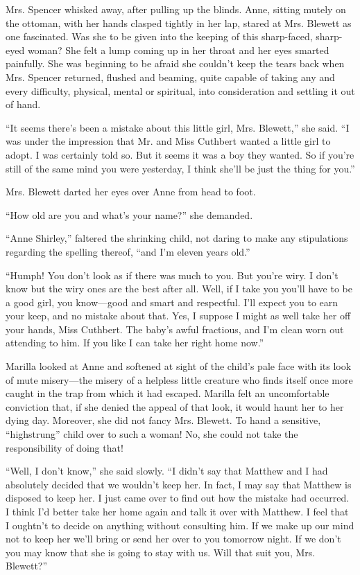 \documentclass[a4paper]{article}
\begin{document}
{{{Mrs. Spencer whisked away, after pulling up the blinds. Anne, sitting mutely on the ottoman, with her hands clasped tightly in her lap, stared at Mrs. Blewett as one fascinated. Was she to be given into the keeping of this sharp-faced, sharp-eyed woman? She felt a lump coming up in her throat and her eyes smarted painfully. She was beginning to be afraid she couldn't keep the tears back when Mrs. Spencer returned, flushed and beaming, quite capable of taking any and every difficulty, physical, mental or spiritual, into consideration and settling it out of hand.}

``It seems there's been a mistake about this little girl, Mrs. Blewett,'' she said. ``I was under the impression that Mr. and Miss Cuthbert wanted a little girl to adopt. I was certainly told so. But it seems it was a boy they wanted. So if you're still of the same mind you were yesterday, I think she'll be just the thing for you.''}

Mrs. Blewett darted her eyes over Anne from head to foot.}

``How old are you and what's your name?'' she demanded.

``Anne Shirley,'' \tiny{faltered the shrinking child, not daring to make any stipulations regarding the spelling thereof}, ``and I'm eleven years old.''

``Humph! You don't look as if there was much to you. But you're wiry. I don't know but the wiry ones are the best after all. \scriptsize{Well, if I take you you'll have to be a good girl, you know---good and smart and respectful. I'll expect you to earn your keep, and no mistake about that.} Yes, I suppose I might as well take her off your hands, Miss Cuthbert. The baby's awful fractious, and I'm clean worn out attending to him. If you like I can take her right home now.''

Marilla looked at Anne and softened at sight of the child's pale face with its look of mute misery---the misery of a helpless little creature who finds itself once more caught in the trap from which it had escaped. \footnotesize{Marilla felt an uncomfortable conviction that, if she denied the appeal of that look, it would haunt her to her dying day. Moreover, she did not fancy Mrs. Blewett.} To hand a sensitive, ``highstrung'' child over to such a woman! No, she could not take the responsibility of doing that!

``Well, I don't know,'' she said slowly. ``I didn't say that Matthew and I had absolutely decided that we wouldn't keep her. In fact, I may say that Matthew is disposed to keep her. \small{I just came over to find out how the mistake had occurred. I think I'd better take her home again and talk it over with Matthew. I feel that I oughtn't to decide on anything without consulting him.} If we make up our mind not to keep her we'll bring or send her over to you tomorrow night. If we don't you may know that she is going to stay with us. Will that suit you, Mrs. Blewett?''
\end{document}
